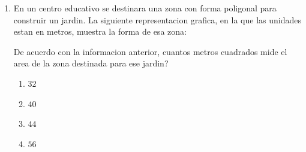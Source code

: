 \documentclass[12pt]{article}
\newcommand{\puntograficoitemunoafirmacioncuatro}{0.14}
\begin{document}
\begin{enumerate}[label=\textbf{\arabic*.}, itemsep=1.1cm]
De acuerdo con la informacion anterior, si las ubicaciones que tienen los telefonos celulares $W$, $K$, $L$ y $M$ corresponden, respectivamente, a los puntos $(10,12)$, $(14,8)$, $(2,2)$ y $(7,15)$, entonces \textquestiondown en cual de esos telefonos se pueden realizar y recibir llamadas por medio de la senal de esa antena?

\begin{enumerate}[label=\Alph*)]
  \item $W$
  \item $K$
  \item $L$
  \item $M$
\end{enumerate}

\Needspace{0.92\textheight}
\item
En un centro educativo se destinara una zona con forma poligonal para construir un jardin. La siguiente representacion grafica, en la que las unidades estan en metros, muestra la forma de esa zona:

\begin{center}
\end{center}

De acuerdo con la informacion anterior, \textquestiondown cuantos metros cuadrados mide el area de la zona destinada para ese jardin?

\begin{enumerate}[label=\Alph*)]
  \item $32$
  \item $40$
  \item $44$
  \item $56$
\end{enumerate}


\end{enumerate}
\end{document}
